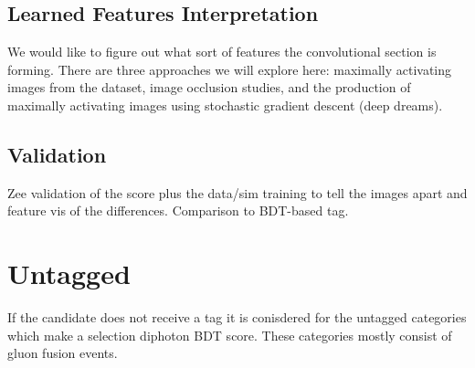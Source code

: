 \subsection{Learned Features Interpretation}
We would like to figure out what sort of features the convolutional section is forming. There are three approaches we will explore here: maximally activating images from the dataset, image occlusion studies, and the production of maximally activating images using stochastic gradient descent (deep dreams).  


\subsection{Validation}
Zee validation of the score plus the data/sim training to tell the images apart and feature vis of the differences. Comparison to BDT-based tag. 


\section{Untagged}
If the candidate does not receive a tag it is conisdered for the untagged categories which make a selection diphoton BDT score. These categories mostly consist of gluon fusion events. 


